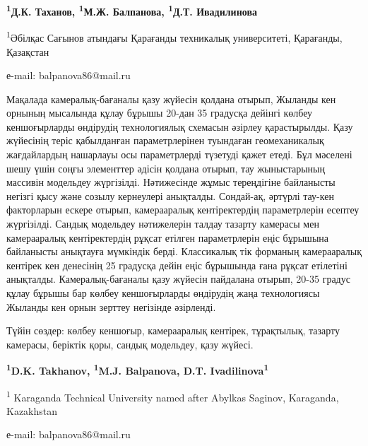 \begin{center}
{\bfseries \textsuperscript{1}Д.К. Таханов, \textsuperscript{1}М.Ж.
Балпанова\envelope, \textsuperscript{1}Д.Т. Ивадилинова}

\textsuperscript{1}Әбілқас Сағынов атындағы Қарағанды техникалық
университеті, Қарағанды, Қазақстан

е-mail: balpanova86@mail.ru
\end{center}

Мақалада камералық-бағаналы қазу жүйесін қолдана отырып, Жыланды кен
орнының мысалында құлау бұрышы 20-дан 35 градусқа дейінгі көлбеу
кеншоғырларды өндірудің технологиялық схемасын әзірлеу қарастырылды.
Қазу жүйесінің теріс қабылданған параметрлерінен туындаған
геомеханикалық жағдайлардың нашарлауы осы параметрлерді түзетуді қажет
етеді. Бұл мәселені шешу үшін соңғы элементтер әдісін қолдана отырып,
тау жыныстарының массивін модельдеу жүргізілді. Нәтижесінде жұмыс
тереңдігіне байланысты негізгі қысу және созылу кернеулері анықталды.
Сондай-ақ, әртүрлі тау-кен факторларын ескере отырып, камерааралық
кентіректердің параметрлерін есептеу жүргізілді. Сандық модельдеу
нәтижелерін талдау тазарту камерасы мен камерааралық кентіректердің
рұқсат етілген параметрлерін еңіс бұрышына байланысты анықтауға
мүмкіндік берді. Классикалық тік форманың камерааралық кентірек кен
денесінің 25 градусқа дейін еңіс бұрышында ғана рұқсат етілетіні
анықталды. Камералық-бағаналы қазу жүйесін пайдалана отырып, 20-35
градус құлау бұрышы бар көлбеу кеншоғырларды өндірудің жаңа технологиясы
Жыланды кен орнын зерттеу негізінде әзірленді.

Түйін сөздер: көлбеу кеншоғыр, камерааралық кентірек, тұрақтылық,
тазарту камерасы, беріктік қоры, сандық модельдеу, қазу жүйесі.


\begin{center}
{\bfseries \textsuperscript{1}D.K. Takhanov, \textsuperscript{1}M.J.
Balpanova\envelope, D.T. Ivadilinova\textsuperscript{1}}

\textsuperscript{1} Karaganda Technical University named after Abylkas
Saginov, Karaganda, Kazakhstan

е-mail: balpanova86@mail.ru
\end{center}

